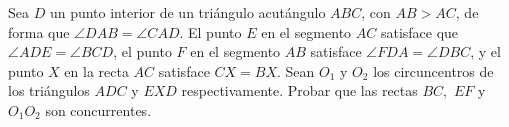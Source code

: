 Sea $D$ un punto interior de un triángulo acutángulo $ABC$, con $AB \gt AC$, de forma que $\angle DAB = \angle CAD$. El punto $E$ en el segmento $AC$ satisface que $\angle ADE = \angle BCD$, el punto $F$ en el segmento $AB$ satisface $\angle FDA = \angle DBC$, y el punto $X$ en la recta $AC$ satisface $CX = BX$. Sean $O_1$ y $O_2$ los circuncentros de los triángulos $ADC$ y $EXD$ respectivamente. Probar que las rectas $BC,$ $EF$ y $O_1O_2$ son concurrentes.